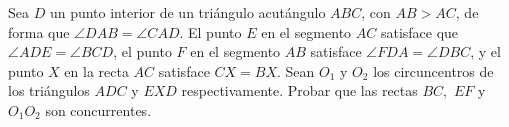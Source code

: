 Sea $D$ un punto interior de un triángulo acutángulo $ABC$, con $AB \gt AC$, de forma que $\angle DAB = \angle CAD$. El punto $E$ en el segmento $AC$ satisface que $\angle ADE = \angle BCD$, el punto $F$ en el segmento $AB$ satisface $\angle FDA = \angle DBC$, y el punto $X$ en la recta $AC$ satisface $CX = BX$. Sean $O_1$ y $O_2$ los circuncentros de los triángulos $ADC$ y $EXD$ respectivamente. Probar que las rectas $BC,$ $EF$ y $O_1O_2$ son concurrentes.